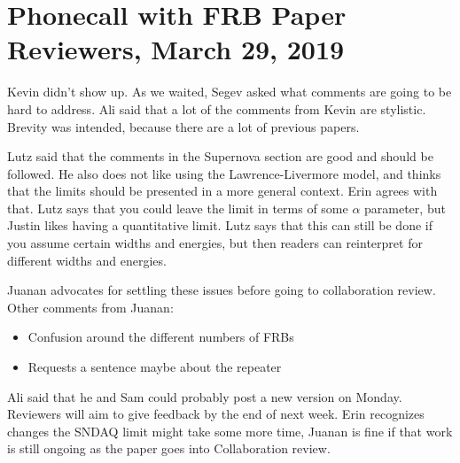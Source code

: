 \chapter{Phonecall with FRB Paper Reviewers, March 29, 2019}

Kevin didn't show up. As we waited, Segev asked what comments are going to be hard to address. Ali said that a lot of the comments from Kevin are stylistic. Brevity was intended, because there are a lot of previous papers.

Lutz said that the comments in the Supernova section are good and should be followed. He also does not like using the Lawrence-Livermore model, and thinks that the limits should be presented in a more general context. Erin agrees with that. Lutz says that you could leave the limit in terms of some $\alpha$ parameter, but Justin likes having a quantitative limit. Lutz says that this can still be done if you assume certain widths and energies, but then readers can reinterpret for different widths and energies. 

Juanan advocates for settling these issues before going to collaboration review. Other comments from Juanan:

\begin{itemize}
    \item Confusion around the different numbers of FRBs
    \item Requests a sentence maybe about the repeater
\end{itemize}

Ali said that he and Sam could probably post a new version on Monday. Reviewers will aim to give feedback by the end of next week. Erin recognizes changes the SNDAQ limit might take some more time, Juanan is fine if that work is still ongoing as the paper goes into Collaboration review. 